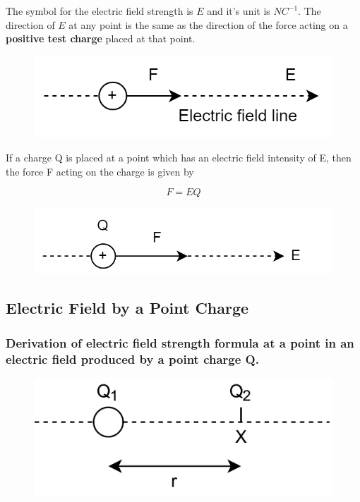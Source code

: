 \documentclass[../../../main.tex]{subfiles}
\begin{document}
The symbol for the electric field strength is \(E\) and it's unit is \(NC^{-1}\).
The direction of \(E\) at any point is the same as the direction of the force acting on a \textbf{positive test charge} placed at that point.

\begin{figure}[h]
    \includegraphics[scale=0.3]{figures/7.png}
    \centering
\end{figure}

If a charge Q is placed at a point which has an electric field intensity of E, then the force F acting on the charge is given by

\begin{equation}
    F=EQ
\end{equation}

\begin{figure}[h]
    \includegraphics[scale=0.3]{figures/8.png}
    \centering
\end{figure}

\subsection{Electric Field by a Point Charge}

\subsubsection{Derivation of electric field strength formula at a point in an electric field produced by a point charge Q.}

\begin{figure}[h]
    \includegraphics[scale=0.3]{figures/1.png}
    \centering
\end{figure}
\end{document}

